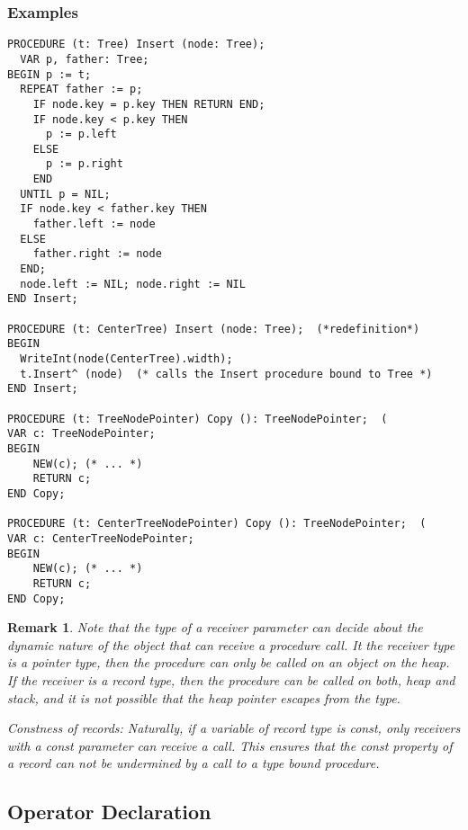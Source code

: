 \documentclass[a4wide,11pt]{article}
\newtheorem{remark}{Remark}
\begin{document}
\begin{annotation}
\subsubsection{Examples}
\begin{lstlisting}[style=example]
PROCEDURE (t: Tree) Insert (node: Tree);
  VAR p, father: Tree;
BEGIN p := t;
  REPEAT father := p;
    IF node.key = p.key THEN RETURN END;
    IF node.key < p.key THEN
      p := p.left
    ELSE
      p := p.right
    END
  UNTIL p = NIL;
  IF node.key < father.key THEN
    father.left := node
  ELSE
    father.right := node
  END;
  node.left := NIL; node.right := NIL
END Insert;

PROCEDURE (t: CenterTree) Insert (node: Tree);  (*redefinition*)
BEGIN
  WriteInt(node(CenterTree).width);
  t.Insert^ (node)  (* calls the Insert procedure bound to Tree *)
END Insert;

PROCEDURE (t: TreeNodePointer) Copy (): TreeNodePointer;  (
VAR c: TreeNodePointer;
BEGIN
	NEW(c); (* ... *)
	RETURN c;
END Copy;

PROCEDURE (t: CenterTreeNodePointer) Copy (): TreeNodePointer;  (
VAR c: CenterTreeNodePointer;
BEGIN
	NEW(c); (* ... *)
	RETURN c;
END Copy;

\end{lstlisting}

\begin{remark} Note that the type of a receiver parameter can decide about the dynamic nature of the object that can receive a procedure call.
It the receiver type is a pointer type, then the procedure can only be called on an object on the heap.
If the receiver is a record type, then the procedure can be called on both, heap and stack, and it is not possible that the heap pointer escapes from the type.

Constness of records: Naturally, if a variable of record type is const, only receivers with a const parameter can receive a call.
This ensures that the const property of a record can not be undermined by a call to a type bound procedure.
\end{remark}

\end{annotation}


\subsection{Operator Declaration}\label{subsection: Operator Declaration}
\end{document}
